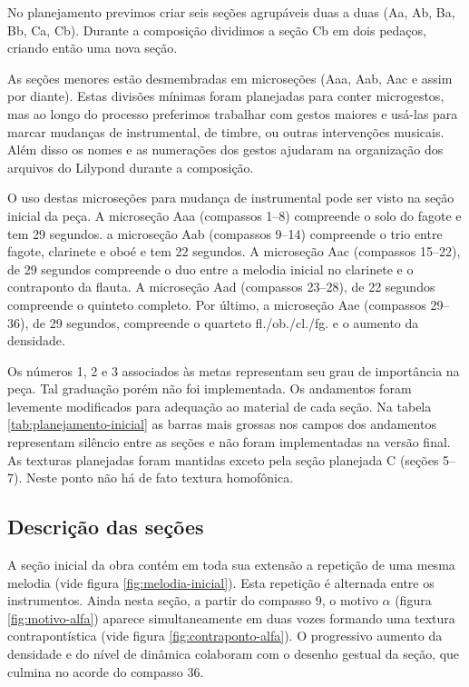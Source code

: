 No planejamento previmos criar seis seções agrupáveis duas a duas (Aa,
Ab, Ba, Bb, Ca, Cb). Durante a composição dividimos a seção Cb em dois
pedaços, criando então uma nova seção.

As seções menores estão desmembradas em microseções (Aaa, Aab, Aac e
assim por diante). Estas divisões mínimas foram planejadas para conter
microgestos, mas ao longo do processo preferimos trabalhar com gestos
maiores e usá-las para marcar mudanças de instrumental, de timbre, ou
outras intervenções musicais. Além disso os nomes e as numerações dos
gestos ajudaram na organização dos arquivos do Lilypond durante a
composição.

O uso destas microseções para mudança de instrumental pode ser visto
na seção inicial da peça. A microseção Aaa (compassos 1--8) compreende
o solo do fagote e tem 29 segundos. a microseção Aab (compassos 9--14)
compreende o trio entre fagote, clarinete e oboé e tem 22 segundos. A
microseção Aac (compassos 15--22), de 29 segundos compreende o duo
entre a melodia inicial no clarinete e o contraponto da flauta. A
microseção Aad (compassos 23--28), de 22 segundos compreende o
quinteto completo. Por último, a microseção Aae (compassos 29--36), de
29 segundos, compreende o quarteto fl./ob./cl./fg. e o aumento da
densidade.

Os números 1, 2 e 3 associados às metas representam seu grau de
importância na peça.
Tal graduação porém não foi implementada. Os andamentos foram
levemente modificados para adequação ao material de cada seção. Na
tabela \ref{tab:planejamento-inicial} as barras mais grossas nos
campos dos andamentos representam silêncio entre as seções e não foram
implementadas na versão final. As texturas planejadas foram mantidas
exceto pela seção planejada C (seções 5--7). Neste ponto não há de
fato textura homofônica.

\subsection{Descrição das seções}
\label{sec:descricao-das-secoes}

A seção inicial da obra contém em toda sua extensão a repetição de uma
mesma melodia (vide figura \ref{fig:melodia-inicial}). Esta repetição
é alternada entre os instrumentos. Ainda nesta seção, a partir do
compasso 9, o motivo $\alpha$ (figura \ref{fig:motivo-alfa}) aparece
simultaneamente em duas vozes formando uma textura contrapontística
(vide figura \ref{fig:contraponto-alfa}). O progressivo aumento da
densidade e do nível de dinâmica colaboram com o desenho gestual da
seção, que culmina no acorde do compasso 36.

